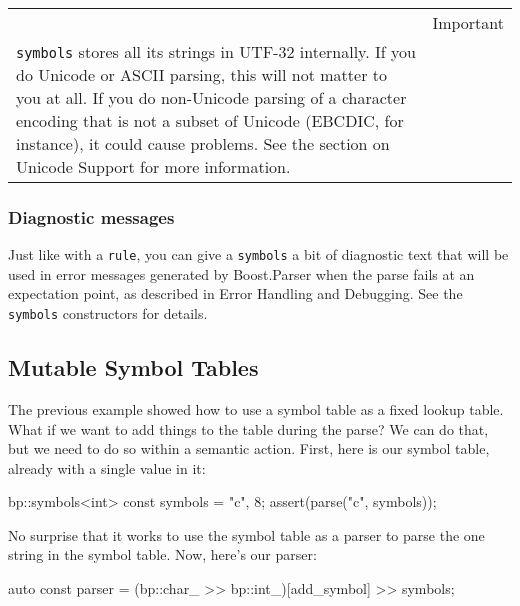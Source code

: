 \begin{longtable}[]{@{}
  >{\raggedright\arraybackslash}p{}
  >{\raggedright\arraybackslash}p{}@{}}
\toprule\noalign{}
\endhead
\bottomrule\noalign{}
\endlastfoot
\begin{minipage}[t]{\linewidth}\raggedright
\end{minipage} & Important \\
\texttt{symbols} stores all its strings in UTF-32 internally. If you do Unicode or ASCII parsing, this will not matter to you at all. If you do non-Unicode parsing of a character encoding that is not a subset of Unicode (EBCDIC, for instance), it could cause problems. See the section on Unicode Support for more information. & \\
\end{longtable}

\subsubsection{Diagnostic messages}

Just like with a \texttt{rule}, you can give a \texttt{symbols} a bit of diagnostic text that will be used in error messages generated by Boost.Parser when the parse fails at an expectation point, as described in Error Handling and Debugging. See the \texttt{symbols} constructors for details.

\subsection{Mutable Symbol Tables}

The previous example showed how to use a symbol table as a fixed lookup table. What if we want to add things to the table during the parse? We can do that, but we need to do so within a semantic action. First, here is our symbol table, already with a single value in it:

\begin{code}
bp::symbols<int> const symbols = {{"c", 8}};
assert(parse("c", symbols));
\end{code}

No surprise that it works to use the symbol table as a parser to parse the one string in the symbol table. Now, here's our parser:

\begin{code}
auto const parser = (bp::char_ >> bp::int_)[add_symbol] >> symbols;
\end{code}

